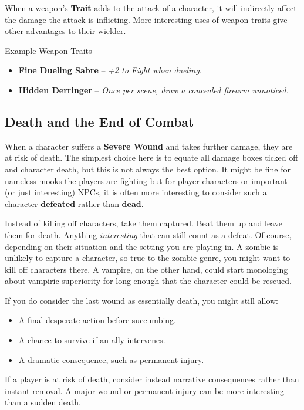 \begin{multicols}{2}
When a weapon's \textbf{Trait} adds to the attack of a character, it will indirectly affect the damage the attack is inflicting. More interesting uses of weapon traits give other advantages to their wielder.

\begin{Example}{Example Weapon Traits}
	\begin{itemize}
    	\item \textbf{Fine Dueling Sabre} – \textit{+2 to Fight when dueling.}
	    \item \textbf{Hidden Derringer} – \textit{Once per scene, draw a concealed firearm unnoticed.}
	\end{itemize}
\end{Example}

\subsection{Death and the End of Combat}\label{core:death}
When a character suffers a \textbf{Severe Wound} and takes further damage, they are at risk of death. The simplest choice here is to equate all damage boxes ticked off and character death, but this is not always the best option. It might be fine for nameless mooks the players are fighting but for player characters or important (or just interesting) NPCs, it is often more interesting to consider such a character \textbf{defeated} rather than \textbf{dead}.

Instead of killing off characters, take them captured. Beat them up and leave them for death. Anything \emph{interesting} that can still count as a defeat. Of course, depending on their situation and the setting you are playing in. A zombie is unlikely to capture a character, so true to the zombie genre, you might want to kill off characters there. A vampire, on the other hand, could start monologing about vampiric superiority for long enough that the character could be rescued. 

If you do consider the last wound as essentially death, you might still allow:
\begin{itemize}
    \item A final desperate action before succumbing.
    \item A chance to survive if an ally intervenes.
    \item A dramatic consequence, such as permanent injury.
\end{itemize}

\begin{GmTips}
	If a player is at risk of death, consider instead narrative consequences rather than instant removal. A major wound or permanent injury can be more interesting than a sudden death.
\end{GmTips}



\end{multicols}
